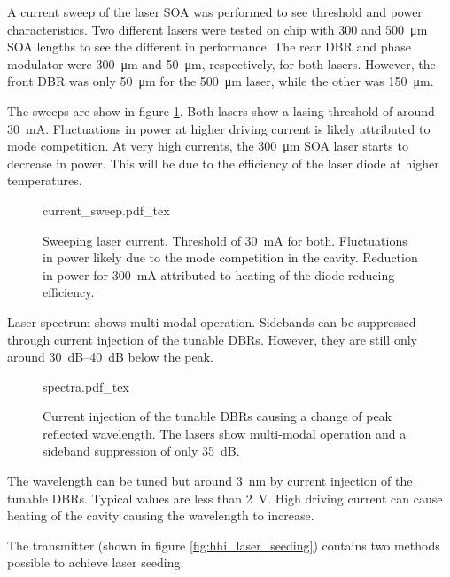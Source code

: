 A current sweep of the laser \ac{SOA} was performed to see threshold and power characteristics. Two different lasers were tested on chip with \num{300} and \SI{500}{\um} \ac{SOA} lengths to see the different in performance. The rear \ac{DBR} and phase modulator were \SI{300}{\um} and \SI{50}{\um}, respectively, for both lasers. However, the front \ac{DBR} was only \SI{50}{\um} for the \SI{500}{\um} laser, while the other was \SI{150}{\um}.

The sweeps are show in figure \ref{fig:hhi_soa_sweep}. Both lasers show a lasing threshold of around \SI{30}{\mA}. Fluctuations in power at higher driving current is likely attributed to mode competition. At very high currents, the \SI{300}{\um} \ac{SOA} laser starts to decrease in power. This will be due to the efficiency of the laser diode at higher temperatures.

\begin{figure}[tp]
	\centering
	\small	
	\def\svgwidth{\textwidth} 
	{current_sweep.pdf_tex}
	\caption[Current sweep of HHI laser SOA]{Sweeping laser current. Threshold of \SI{30}{\mA} for both. Fluctuations in power likely due to the mode competition in the cavity. Reduction in power for \SI{300}{mA} attributed to heating of the diode reducing efficiency.}
	\label{fig:hhi_soa_sweep}
\end{figure}

Laser spectrum shows multi-modal operation. Sidebands can be suppressed through current injection of the tunable \acp{DBR}. However, they are still only around \SIrange{30}{40}{dB} below the peak. 

\begin{figure}[tp]
	\centering
	\small	
	\def\svgwidth{\textwidth} 
	{spectra.pdf_tex}
	\caption[Wavelength sweep through current injection of tunable DBRs]{Current injection of the tunable \acp{DBR} causing a change of peak reflected wavelength. The lasers show multi-modal operation and a sideband suppression of only \SI{35}{dB}.}
	\label{fig:hhi_dbr_sweep}
\end{figure}

The wavelength can be tuned but around \SI{3}{nm} by current injection of the tunable \acp{DBR}. Typical values are less than \SI{2}{V}. High driving current can cause heating of the cavity causing the wavelength to increase. 

The transmitter (shown in figure \ref{fig:hhi_laser_seeding}) contains two methods possible to achieve laser seeding.

